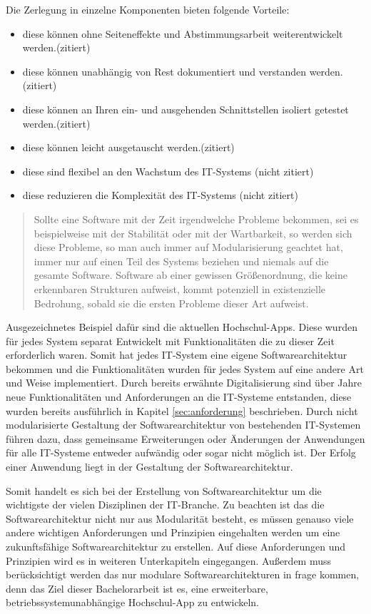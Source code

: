 Die Zerlegung in einzelne Komponenten bieten folgende Vorteile:
\begin{itemize}
\item diese können ohne Seiteneffekte und Abstimmungsarbeit weiterentwickelt werden.(zitiert)
\item diese können unabhängig von Rest dokumentiert und verstanden werden.(zitiert)
\item diese können an Ihren ein- und ausgehenden Schnittstellen isoliert getestet werden.(zitiert)
\item diese können leicht ausgetauscht werden.(zitiert)
\item diese sind flexibel an den Wachstum des IT-Systems (nicht zitiert)
\item diese reduzieren die Komplexität des IT-Systems (nicht zitiert)
\end{itemize}

\begin{quote}
Sollte eine Software mit der Zeit irgendwelche Probleme bekommen, sei es beispielweise mit der Stabilität oder mit der Wartbarkeit, so werden sich diese Probleme, so man auch immer auf Modularisierung geachtet hat, immer nur auf einen Teil des Systems beziehen und niemals auf die gesamte Software. Software ab einer gewissen Größenordnung, die keine erkennbaren Strukturen aufweist, kommt potenziell in existenzielle Bedrohung, sobald sie die ersten Probleme dieser Art aufweist.
\end{quote}

Ausgezeichnetes Beispiel dafür sind die aktuellen Hochschul-Apps. Diese wurden für jedes System separat Entwickelt mit Funktionalitäten die zu dieser Zeit erforderlich waren. Somit hat jedes IT-System eine eigene Softwarearchitektur bekommen und die Funktionalitäten wurden für jedes System auf eine andere Art und Weise implementiert. Durch bereits erwähnte Digitalisierung sind über Jahre neue Funktionalitäten und Anforderungen an die IT-Systeme entstanden, diese wurden bereits ausführlich in Kapitel \ref{sec:anforderung} beschrieben. Durch nicht modularisierte Gestaltung der Softwarearchitektur von bestehenden IT-Systemen führen dazu, dass gemeinsame Erweiterungen oder Änderungen der Anwendungen für alle IT-Systeme entweder aufwändig oder sogar nicht möglich ist. Der Erfolg einer Anwendung liegt in der Gestaltung der Softwarearchitektur. 

Somit handelt es sich bei der Erstellung von Softwarearchitektur um die wichtigste der vielen Disziplinen der IT-Branche. Zu beachten ist das die Softwarearchitektur nicht nur aus Modularität besteht, es müssen genauso viele andere wichtigen Anforderungen und Prinzipien eingehalten werden um eine zukunftsfähige Softwarearchitektur zu erstellen. Auf diese Anforderungen und Prinzipien wird es in weiteren Unterkapiteln eingegangen. Außerdem muss berücksichtigt werden das nur modulare Softwarearchitekturen in frage kommen, denn das Ziel dieser Bachelorarbeit ist es, eine erweiterbare, betriebssystemunabhängige Hochschul-App zu entwickeln.


